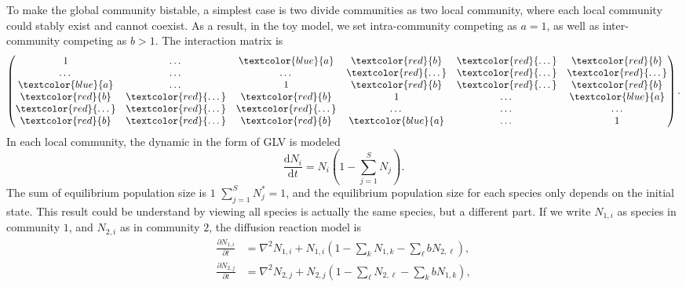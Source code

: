     To make the global community bistable, a simplest case is two divide communities as two local community, where each local community could stably exist and cannot coexist. As a result, in the toy model, we set intra-community competing as $a = 1$, as well as inter-community competing as $b > 1$. The interaction matrix is
    \begin{equation*}
        \begin{pmatrix}
            1       &\dots&\textcolor{blue}{a}      &\textcolor{red}{b}   &\textcolor{red}{\dots}  &\textcolor{red}{b}  \\
            \dots   &\dots&\dots                    &\textcolor{red}{\dots}  &\textcolor{red}{\dots}  &\textcolor{red}{\dots}  \\
            \textcolor{blue}{a}&\dots&1             &\textcolor{red}{b}   &\textcolor{red}{\dots}  &\textcolor{red}{b}  \\
            \textcolor{red}{b}&\textcolor{red}{\dots} &\textcolor{red}{b}  &1    &\dots&\textcolor{blue}{a}  \\
            \textcolor{red}{\dots}  &\textcolor{red}{\dots}  &\textcolor{red}{\dots}                   &\dots   &\dots &\dots  \\
            \textcolor{red}{b}&\textcolor{red}{\dots} &\textcolor{red}{b}  &\textcolor{blue}{a}   &\dots&1  \\
        \end{pmatrix}.
    \end{equation*}
    In each local community, the dynamic in the form of GLV is modeled
    \begin{equation}
        \frac{\mathrm{d} N_i}{\mathrm{d} t} = N_i \left( 1 - \sum_{j=1}^{S} N_j \right).
    \end{equation}
    The sum of equilibrium population size is $1$ $\sum_{j=1}^{S} N^*_j = 1$, and the equilibrium population size for each species only depends on the initial state. This result could be understand by viewing all species is actually the same species, but a different part. If we write $N_{1,i}$ as species in community $1$, and $N_{2,i}$ as in community $2$, the diffusion reaction model is
    \begin{equation*}
        \begin{aligned}
            \frac{\partial N_{1,i}}{\partial t}
            & = \nabla^2 N_{1,i} 
            + N_{1,i} 
            \left( 
                1 
                - \sum_{k} N_{1,k} 
                - \sum_{\ell} b N_{2,\ell} 
            \right),\\
            \frac{\partial N_{2,j}}{\partial t}
            &= \nabla^2 N_{2,j} 
            + N_{2,j} 
            \left( 
                1 
                - \sum_{\ell} N_{2,\ell} 
                - \sum_{k} b N_{1,k} 
            \right),
        \end{aligned}
    \end{equation*}
